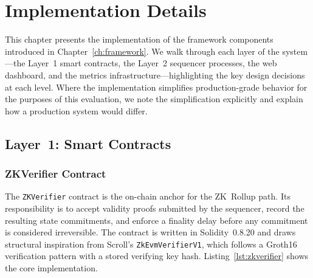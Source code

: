 \chapter{Implementation Details}
\label{ch:implementation}

This chapter presents the implementation of the framework components introduced in Chapter~\ref{ch:framework}. We walk through each layer of the system---the Layer~1 smart contracts, the Layer~2 sequencer processes, the web dashboard, and the metrics infrastructure---highlighting the key design decisions at each level. Where the implementation simplifies production-grade behavior for the purposes of this evaluation, we note the simplification explicitly and explain how a production system would differ.

\section{Layer~1: Smart Contracts}

\subsection{ZKVerifier Contract}

The \texttt{ZKVerifier} contract is the on-chain anchor for the ZK~Rollup path. Its responsibility is to accept validity proofs submitted by the sequencer, record the resulting state commitments, and enforce a finality delay before any commitment is considered irreversible. The contract is written in Solidity~0.8.20 and draws structural inspiration from Scroll's \texttt{ZkEvmVerifierV1}, which follows a Groth16 verification pattern with a stored verifying key hash. Listing~\ref{lst:zkverifier} shows the core implementation.

